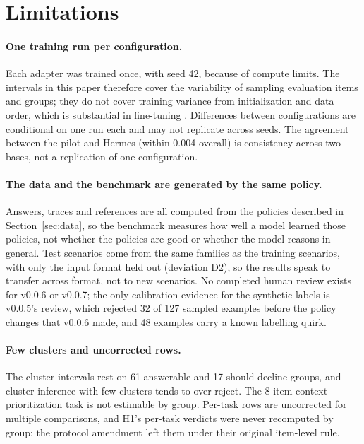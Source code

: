 \section{Limitations}\label{sec:limitations}

\paragraph{One training run per configuration.}
Each adapter was trained once, with seed 42, because of compute limits. The intervals in this paper therefore cover the variability of sampling evaluation items and groups; they do not cover training variance from initialization and data order, which is substantial in fine-tuning \citep{dodge2020finetuning}. Differences between configurations are conditional on one run each and may not replicate across seeds. The agreement between the pilot and Hermes (within 0.004 overall) is consistency across two bases, not a replication of one configuration.

\paragraph{The data and the benchmark are generated by the same policy.}
Answers, traces and references are all computed from the policies described in Section~\ref{sec:data}, so the benchmark measures how well a model learned those policies, not whether the policies are good or whether the model reasons in general. Test scenarios come from the same families as the training scenarios, with only the input format held out (deviation D2), so the results speak to transfer across format, not to new scenarios. No completed human review exists for v0.0.6 or v0.0.7; the only calibration evidence for the synthetic labels is v0.0.5's review, which rejected 32 of 127 sampled examples before the policy changes that v0.0.6 made, and 48 examples carry a known labelling quirk.

\paragraph{Few clusters and uncorrected rows.}
The cluster intervals rest on 61 answerable and 17 should-decline groups, and cluster inference with few clusters tends to over-reject. The 8-item context-prioritization task is not estimable by group. Per-task rows are uncorrected for multiple comparisons, and H1's per-task verdicts were never recomputed by group; the protocol amendment left them under their original item-level rule.

